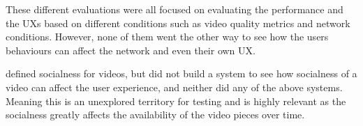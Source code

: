 These different evaluations were all focused on evaluating the performance  and the \acp{UX} based on different conditions such as video quality metrics and network conditions. However, none of them went the other way to see how the users behaviours can affect the network and even their own \ac{UX}.

\citeauthor{broxton2013catching} \cite{broxton2013catching} defined socialness for videos, but did not build a system to see how socialness of a video can affect the user experience, and neither did any of the above systems. Meaning this is an unexplored territory for testing and is highly relevant as the socialness greatly affects the availability of the video pieces over time.


